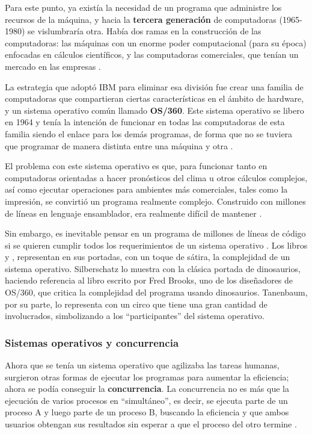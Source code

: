 \documentclass[letterpaper,12pt,oneside]{book}
\begin{document}
		Para este punto, ya existía la necesidad de un programa que administre los recursos de la máquina,  y hacia la \textbf{tercera generación} de computadoras (1965-1980)
		se vislumbraría otra. Había dos ramas en la construcción de las computadoras: las máquinas con un enorme poder computacional (para su época) enfocadas
		en cálculos científicos, y las computadoras comerciales, que tenían un mercado en las empresas \cite{tanenbaum_modern_2002}.
        
        La estrategia que adoptó IBM para eliminar esa división
		fue crear una familia de computadoras que compartieran ciertas características en el ámbito de hardware, y un sistema operativo común llamado
		\textbf{OS/360}. Este sistema operativo se libero en 1964 y tenía la intención de funcionar en todas las computadoras de esta familia siendo el enlace para los demás programas,
		de forma que no se tuviera que programar de manera distinta entre una máquina y otra \cite{tanenbaum_modern_2002}.
  
        El problema con este sistema operativo es que, para funcionar
		tanto en computadoras orientadas a hacer pronósticos del clima u otros cálculos complejos, así como ejecutar operaciones
		para ambientes más comerciales, tales como la impresión, se convirtió un programa realmente complejo. Construido con millones de líneas en lenguaje ensamblador,
		era realmente difícil de mantener \cite{tanenbaum_modern_2002}.
  
        Sin embargo, es inevitable pensar en un programa
		de millones de líneas de código si se quieren cumplir todos los requerimientos de un sistema operativo 
		. Los libros  \cite{tanenbaum_modern_2002} y \cite{silberschatz_operating_2009}, representan en sus portadas, con un toque de sátira,
		la complejidad de un sistema operativo. Silberschatz lo muestra
		con la clásica portada de dinosaurios, haciendo referencia al libro escrito por Fred Brooks, uno de los diseñadores de OS/360, que critica
        la complejidad del programa usando dinosaurios. Tanenbaum, por su parte, lo representa  con un  circo que
		tiene una gran cantidad de involucrados, simbolizando a los ``participantes'' del sistema operativo.

        \subsubsection{Sistemas operativos y concurrencia}
        
		Ahora que se tenía un sistema operativo que agilizaba las tareas humanas, surgieron otras formas de ejecutar
		los programas para aumentar la eficiencia; ahora se podía conseguir la \textbf{concurrencia}. La concurrencia no es más que la ejecución de varios
		procesos en ``simultáneo'', es decir, se ejecuta parte de un proceso A y luego parte de un proceso B, buscando la eficiencia y que ambos usuarios obtengan
		sus resultados sin esperar a que el proceso del otro termine \cite{tanenbaum_modern_2002}.
  
\end{document}
